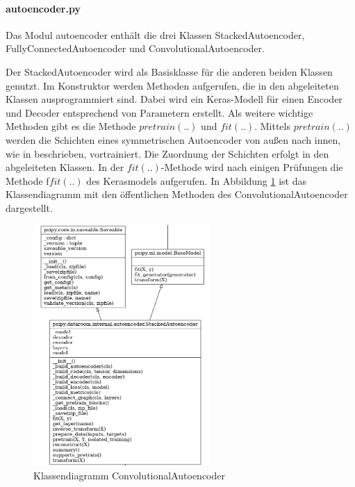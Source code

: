 	\paragraph{autoencoder.py} Das Modul autoencoder enthält die drei Klassen StackedAutoencoder, FullyConnectedAutoencoder und ConvolutionalAutoencoder. 
	
	Der StackedAutoencoder wird als Basisklasse für die anderen beiden Klassen genutzt. Im Konstruktor werden Methoden aufgerufen, die in den abgeleiteten Klassen ausprogrammiert sind. Dabei wird ein Keras-Modell für einen Encoder und Decoder entsprechend von Parametern erstellt. Als weitere wichtige Methoden gibt es die Methode $pretrain(..)$ und $fit(..)$. Mittels $pretrain(..)$ werden die Schichten eines symmetrischen Autoencoder von außen nach innen, wie in \cite{Bengio.2007} beschrieben, vortrainiert. Die Zuordnung der Schichten erfolgt in den abgeleiteten Klassen.
	In der $fit(..)$-Methode wird nach einigen Prüfungen die Methode f$fit(..)$ \cite{Chollet.2015} des Kerasmodels aufgerufen. In Abbildung \ref{img:KlassendiagrammConvolutionalAutoencoder} ist das Klassendiagramm mit den öffentlichen Methoden des ConvolutionalAutoencoder dargestellt. 
	\begin{figure}[h]
		\centering
		\includegraphics[width=0.6\textwidth, center]{bilder/Klassendiagramme/klassendiagramm_public_cae2.png}
		\caption[Klassendiagramm ConvolutionalAutoencoder]{Klassendiagramm ConvolutionalAutoencoder}
		\label{img:KlassendiagrammConvolutionalAutoencoder}
	\end{figure}  
	
